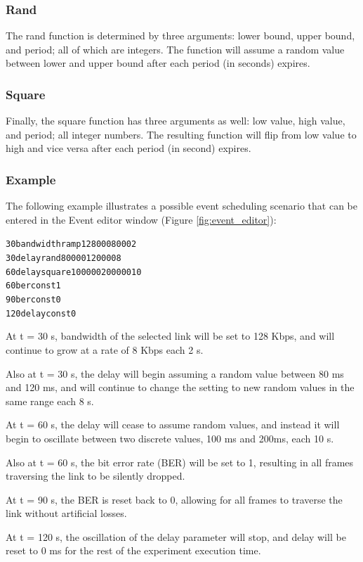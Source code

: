 \subsubsection{Rand}
The rand function is determined by three arguments: lower bound, upper bound,
and period; all of which are integers. The function will assume a random value
between lower and upper bound after each period (in seconds) expires.

\subsubsection{Square}
Finally, the square function has three arguments as well: low value, high
value, and period; all integer numbers. The resulting function will flip from
low value to high and vice versa after each period (in second) expires.

\subsubsection{Example}
The following example illustrates a possible event scheduling scenario that can be entered in the Event editor window (Figure \ref{fig:event_editor}):

\begin{alltt}
    30 bandwidth ramp 128000 8000 2
    30 delay rand 80000 120000 8
    60 delay square 100000 200000 10
    60 ber const 1
    90 ber const 0
    120 delay const 0
\end{alltt}

At t = 30 s, bandwidth of the selected link will be set to 128 Kbps, and will
continue to grow at a rate of 8 Kbps each 2 s.

Also at t = 30 s, the delay will begin assuming a random value between 80 ms
and 120 ms, and will continue to change the setting to new random values in the
same range each 8 s.

At t = 60 s, the delay will cease to assume random values, and instead it will
begin to oscillate between two discrete values, 100 ms and 200ms, each 10 s.

Also at t = 60 s, the bit error rate (BER) will be set to 1, resulting in all
frames traversing the link to be silently dropped.

At t = 90 s, the BER is reset back to 0, allowing for all frames to traverse
the link without artificial losses.

At t = 120 s, the oscillation of the delay parameter will stop, and delay will
be reset to 0 ms for the rest of the experiment execution time.

